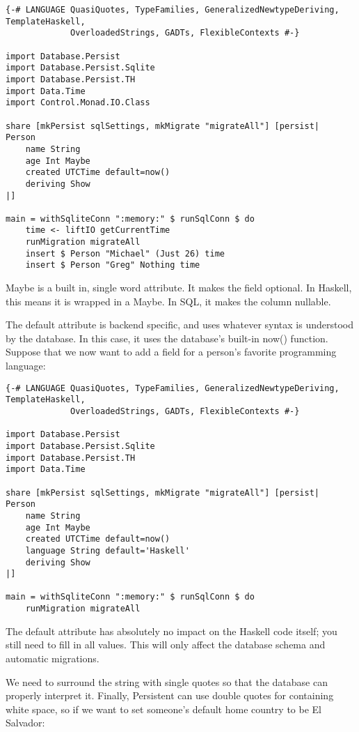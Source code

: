 \begin{lstlisting}
{-# LANGUAGE QuasiQuotes, TypeFamilies, GeneralizedNewtypeDeriving, TemplateHaskell,
             OverloadedStrings, GADTs, FlexibleContexts #-}

import Database.Persist
import Database.Persist.Sqlite
import Database.Persist.TH
import Data.Time
import Control.Monad.IO.Class

share [mkPersist sqlSettings, mkMigrate "migrateAll"] [persist|
Person
    name String
    age Int Maybe
    created UTCTime default=now()
    deriving Show
|]

main = withSqliteConn ":memory:" $ runSqlConn $ do
    time <- liftIO getCurrentTime
    runMigration migrateAll
    insert $ Person "Michael" (Just 26) time
    insert $ Person "Greg" Nothing time
\end{lstlisting}

Maybe is a built in, single word attribute. It makes the field optional. In Haskell, this means it is wrapped in a Maybe. In SQL, it makes the column nullable.

The default attribute is backend specific, and uses whatever syntax is understood by the database. In this case, it uses the database's built-in now() function. Suppose that we now want to add a field for a person's favorite programming language:

\begin{lstlisting}
{-# LANGUAGE QuasiQuotes, TypeFamilies, GeneralizedNewtypeDeriving, TemplateHaskell,
             OverloadedStrings, GADTs, FlexibleContexts #-}

import Database.Persist
import Database.Persist.Sqlite
import Database.Persist.TH
import Data.Time

share [mkPersist sqlSettings, mkMigrate "migrateAll"] [persist|
Person
    name String
    age Int Maybe
    created UTCTime default=now()
    language String default='Haskell'
    deriving Show
|]

main = withSqliteConn ":memory:" $ runSqlConn $ do
    runMigration migrateAll
\end{lstlisting}

The default attribute has absolutely no impact on the Haskell code itself; you still need to fill in all values. This will only affect the database schema and automatic migrations.

We need to surround the string with single quotes so that the database can properly interpret it. Finally, Persistent can use double quotes for containing white space, so if we want to set someone's default home country to be El Salvador:

